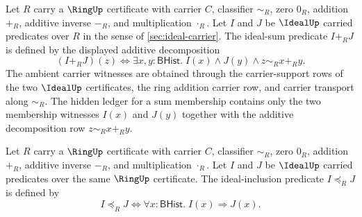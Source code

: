 \begin{definition}
\label{def:ideal-sum-predicate}
Let $R$ carry a $\RingUp$ certificate with carrier $C$, classifier $\sim_R$, zero $0_R$, addition $+_R$, additive inverse $-_R$, and multiplication $\cdot_R$. Let $I$ and $J$ be $\IdealUp$ carried predicates over $R$ in the sense of \autoref{sec:ideal-carrier}. The ideal-sum predicate $I+_RJ$ is defined by the displayed additive decomposition
$$
(I+_RJ)(z)\Longleftrightarrow
\exists x,y:\mathsf{BHist}.\; I(x)\land J(y)\land z\sim_R x+_R y.
$$
The ambient carrier witnesses are obtained through the carrier-support rows of the two $\IdealUp$ certificates, the ring addition carrier row, and carrier transport along $\sim_R$. The hidden ledger for a sum membership contains only the two membership witnesses $I(x)$ and $J(y)$ together with the additive decomposition row $z\sim_R x+_R y$.
\end{definition}

\begin{definition}
\label{def:ideal-inclusion-predicate}
Let $R$ carry a $\RingUp$ certificate with carrier $C$, classifier $\sim_R$, zero $0_R$, addition $+_R$, additive inverse $-_R$, and multiplication $\cdot_R$. Let $I$ and $J$ be $\IdealUp$ carried predicates over the same $\RingUp$ certificate. The ideal-inclusion predicate $I\preceq_RJ$ is defined by
$$
I\preceq_RJ\Longleftrightarrow
\forall x:\mathsf{BHist}.\; I(x)\Longrightarrow J(x).
$$
\end{definition}

